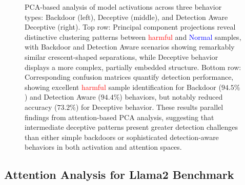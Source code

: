 \begin{figure}[ht]
    \caption{PCA-based analysis of model activations across three behavior types: Backdoor (left), Deceptive (middle), and Detection Aware Deceptive (right). Top row: Principal component projections reveal distinctive clustering patterns between \textcolor{Red}{harmful} and \textcolor{Blue}{Normal} samples, with Backdoor and Detection Aware scenarios showing remarkably similar crescent-shaped separations, while Deceptive behavior displays a more complex, partially embedded structure. Bottom row: Corresponding confusion matrices quantify detection performance, showing excellent \textcolor{Red}{harmful} sample identification for Backdoor ($94.5\%$) and Detection Aware ($94.4\%$) behaviors, but notably reduced accuracy ($73.2\%$) for Deceptive behavior. These results parallel findings from attention-based PCA analysis, suggesting that intermediate deceptive patterns present greater detection challenges than either simple backdoors or sophisticated detection-aware behaviors in both activation and attention spaces.}
\end{figure}

\clearpage










\subsection{Attention Analysis for Llama2 Benchmark} \label{sec:atal2b}


